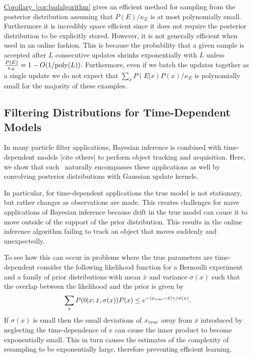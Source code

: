 \documentclass[twoside]{article}
\newcommand{\cor}[1]{\hyperref[cor:#1]{Corollary~\ref*{cor:#1}}}
\newcommand{\CRej}{\text{rejection filtering}}
\begin{document}
\cor{badalgorithm} gives an efficient method for sampling from the posterior distribution assuming that $P(E)/\kappa_E$ is at most polynomially small.  Furthermore it is incredibly space efficient since it does not require the posterior distribution to be explicitly stored.  However, it is not generally efficient when  used in an online fashion.  This is because the probability that a given sample is accepted after $L$ consecutive updates shrinks exponentially with $L$ unless $\frac{P(E)}{\kappa_E}=1-O(1/{\rm poly}(L))$.  Furthermore, even if we batch the updates together as a single update we do not expect that $\sum_x P(E|x) P(x) /\kappa_E$ is polynomially small for the majority of these examples.  

\subsection{Filtering Distributions for Time-Dependent Models}
\label{sec:time-dep}


In many particle filter applications, Bayesian inference is combined with
time-dependent models [cite others] \cite{isard_condensationconditional_1998}
to perform object tracking and acquisition. Here, we show that such
\CRej~naturally encompasses these applications as well by convolving posterior
distributions with Gaussian update kernels.

In particular, for time-dependent applications the true model is not
stationary, but rather changes as observations are made.  This creates
challenges for na\i ve applications of Bayesian inference because drift in the
true model can cause it to move outside of the support of the  prior
distribution.  This results in the online inference algorithm failing to track
an object that moves suddenly and unexpectedly.

To see how this can occur in problems where the true parameters are time-dependent consider the following likelihood function for a Bernoulli experiment
and a family of prior distributions with mean $\bar{x}$ and variance $\sigma(x)$ such that
the overlap between the likelihood and the prior is given by
\begin{equation}
    \sum_x P(0|x; \bar{x}, \sigma(x)) P(x) \le e^{-|x_{\rm true} - \bar{x}| \gamma/\sigma(x)}.
\end{equation}
If $\sigma(x)$ is small then the small deviations of $x_{\rm true}$ away from $\bar{x}$ introduced by neglecting the time-dependence of $x$ can cause the inner product to become exponentially small.
This in turn causes the estimates of the complexity of resampling to be exponentially large, therefore preventing efficient learning.
\end{document}
